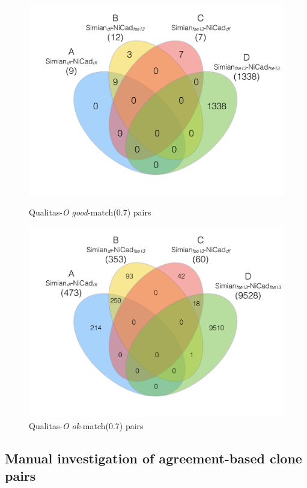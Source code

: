 \documentclass{sig-alternate-05-2015}
\begin{document}
\begin{figure}
	\centering
	\begin{minipage}{.5\textwidth}
		\centering
		\includegraphics[width=0.9\linewidth]{venn4_pairs_good}
		\caption{Qualitas-\textit{O} \textit{good}-match(0.7) pairs}
		\label{fig:venn4_orig_good}
	\end{minipage}%
	\begin{minipage}{.5\textwidth}
		\centering
		\includegraphics[width=0.9\linewidth]{venn4_pairs_ok}
		\caption{Qualitas-\textit{O} \textit{ok}-match(0.7) pairs}
		\label{fig:venn4_orig_ok}
	\end{minipage}
\end{figure}

\subsection{Manual investigation of agreement-based clone pairs}
\end{document}
